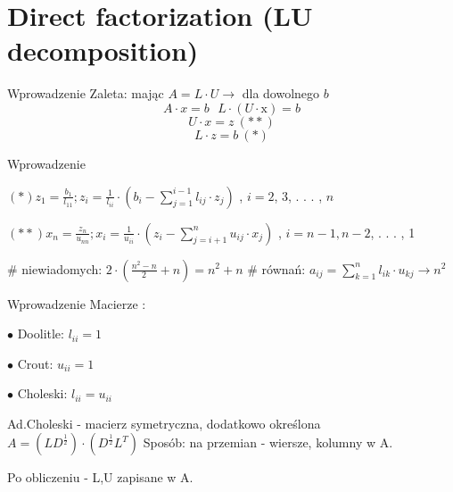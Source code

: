 \section{Direct factorization (LU decomposition)}
\begin{frame}{Wprowadzenie}
Zaleta: mając $A=L\cdot U\rightarrow $ dla dowolnego $b$
$$
A\cdot x=b\ \ \ L\cdot(U\cdot \mathrm{x})=b
$$
$$
U\cdot x=z\ (**)
$$
$$
L\cdot z=b\ (*)
$$
\end{frame}
\begin{frame}{Wprowadzenie}
\begin{center}
$(*)z_{1}=\displaystyle \frac{b_{1}}{l_{11}};z_{i}=\frac{1}{l_{ii}}\cdot(b_{i}-\sum_{j=1}^{i-1}l_{ij}\cdot z_{j})$ , $i=2$, 3, . . . , $n$
\end{center}
$(**)x_{n}=\displaystyle \frac{z_{n}}{u_{nn}};x_{i}=\frac{1}{u_{ii}}\cdot(z_{i}-\sum_{j=i+1}^{n}u_{ij}\cdot x_{j})$ , $i=n-1, n-2$, . . . , 1

\# niewiadomych: $2 \cdot \left( \frac{n^{2}-n}{2}+n\right)=n^{2}+n$ \newline
\# r\'{o}wna\'{n}: $a_{ij}=\displaystyle \sum_{k=1}^{n}l_{ik}\cdot u_{kj}\rightarrow n^{2}$
\end{frame}
\begin{frame}{Wprowadzenie}
Macierze :

$\bullet$ Doolitle: $l_{ii}=1$

$\bullet$ Crout: $u_{ii}=1$

$\bullet$ Choleski: $l_{ii}=u_{ii}$

Ad.Choleski - macierz symetryczna, dodatkowo określona $A=(LD^{\frac{1}{2}})\cdot(D^{\frac{1}{2}}L^{T})$ \newline
Sposób: na przemian - wiersze, kolumny w A.

Po obliczeniu - L,U zapisane w A.
\end{frame}
